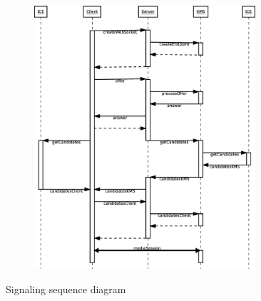 \begin{figure}[!htb]
    \centering
    \begin{subfigure}{}
    	\includegraphics[width=0.9\textwidth]{figures/signaling}
    \end{subfigure}
    \caption{Signaling sequence diagram}
\end{figure} 


